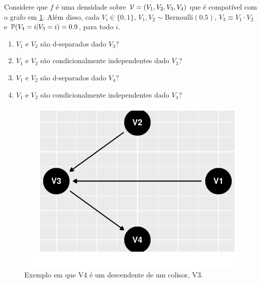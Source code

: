 \begin{exercise}
 Considere que $f$ é uma densidade sobre 
 $\sV = (V_1, V_2, V_3, V_4)$ que é compatível com
 o grafo em \cref{fig:colisor-desc}.
 Além disso, cada $V_i \in \{0,1\}$,
 $V_1, V_2 \sim \text{Bernoulli}(0.5)$,
 $V_3 \equiv V_1 \cdot V_2$ e
 $\P(V_4 = i | V_3 = i) = 0.9$, para todo $i$.
 \begin{enumerate}[label=(\alph*)]
  \item $V_1$ e $V_2$ são d-separados dado $V_3$?
  \item $V_1$ e $V_2$ são condicionalmente independentes dado $V_3$?
  \item $V_1$ e $V_2$ são d-separados dado $V_4$?
  \item $V_1$ e $V_2$ são condicionalmente independentes dado $V_4$?
 \end{enumerate}
 
\begin{knitrout}
\color{fgcolor}\begin{figure}[t]

{\centering \includegraphics[width=\maxwidth]{./figures/colisor-desc-1} 

}

\caption[Exemplo em que V4 é um descendente de um colisor, V3]{Exemplo em que V4 é um descendente de um colisor, V3.}\label{fig:colisor-desc}
\end{figure}

\end{knitrout}
\end{exercise}

